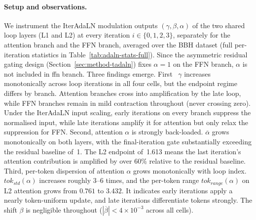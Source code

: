 \paragraph{Setup and observations.}
We instrument the IterAdaLN modulation outputs $(\gamma, \beta, \alpha)$ of the two shared loop layers (L1 and L2) at every iteration $i \in \{0,1,2,3\}$, separately for the attention branch and the FFN branch, averaged over the BBH dataset (full per-iteration statistics in Table~\ref{tab:adaln-stats-full}). Since the asymmetric residual gating design (Section~\ref{sec:method-tadaln}) fixes $\alpha\!=\!1$ on the FFN branch, $\alpha$ is not included in ffn branch. Three findings emerge. First ~$\gamma$ increases monotonically across loop iterations in all four cells, but the endpoint regime differs by branch. Attention branches cross into amplification by the late loop, while FFN branches remain in mild contraction throughout (never crossing zero). Under the IterAdaLN input scaling, early iterations on every branch suppress the normalised input, while late iterations amplify it for attention but only relax the suppression for FFN. Second, attention $\alpha$ is strongly back-loaded. $\overline{\alpha}$ grows monotonically on both layers, with the final-iteration gate substantially exceeding the residual baseline of~1. The L2 endpoint of~1.613 means the last iteration's attention contribution is amplified by over 60\% relative to the residual baseline. Third, per-token dispersion of attention $\alpha$ grows monotonically with loop index. $tok_{std}(\alpha)$ increases roughly $3$--$6$ times, and the per-token range $tok_{range}(\alpha)$ on L2 attention grows from $0.761$ to $3.432$. It indicates early iterations apply a nearly token-uniform update, and late iterations differentiate tokens strongly. The shift $\beta$ is negligible throughout ($|\overline{\beta}|<4\!\times\!10^{-3}$ across all cells).

